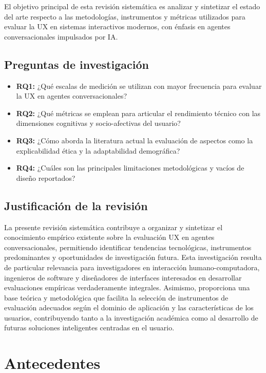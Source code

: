 \documentclass[11pt,twocolumn]{article}
\begin{document}
El objetivo principal de esta revisión sistemática es analizar y sintetizar el estado del arte respecto a las metodologías, instrumentos y métricas utilizados para evaluar la UX en sistemas interactivos modernos, con énfasis en agentes conversacionales impulsados por IA.

\subsection{Preguntas de investigación}

\begin{itemize}[leftmargin=*, labelsep=5pt, itemsep=2pt]
    \item \textbf{RQ1:} ¿Qué escalas de medición se utilizan con mayor frecuencia para evaluar la UX en agentes conversacionales?
    \item \textbf{RQ2:} ¿Qué métricas se emplean para articular el rendimiento técnico con las dimensiones cognitivas y socio-afectivas del usuario?
    \item \textbf{RQ3:} ¿Cómo aborda la literatura actual la evaluación de aspectos como la explicabilidad ética y la adaptabilidad demográfica?
    \item \textbf{RQ4:} ¿Cuáles son las principales limitaciones metodológicas y vacíos de diseño reportados?
\end{itemize}

\subsection{Justificación de la revisión}

La presente revisión sistemática contribuye a organizar y sintetizar el conocimiento empírico existente sobre la evaluación UX en agentes conversacionales, permitiendo identificar tendencias tecnológicas, instrumentos predominantes y oportunidades de investigación futura. Esta investigación resulta de particular relevancia para investigadores en interacción humano-computadora, ingenieros de software y diseñadores de interfaces interesados en desarrollar evaluaciones empíricas verdaderamente integrales. Asimismo, proporciona una base teórica y metodológica que facilita la selección de instrumentos de evaluación adecuados según el dominio de aplicación y las características de los usuarios, contribuyendo tanto a la investigación académica como al desarrollo de futuras soluciones inteligentes centradas en el usuario.

\section{Antecedentes}
\end{document}
